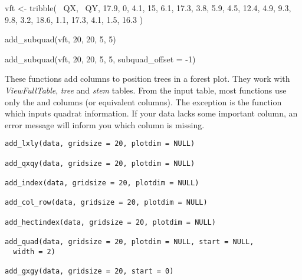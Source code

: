 \documentclass[a4paper]{book}
\begin{document}
%
\begin{Examples}
\begin{ExampleCode}
vft <- tribble(
   ~QX,  ~QY,
  17.9,    0,
   4.1,   15,
   6.1, 17.3,
   3.8,  5.9,
   4.5, 12.4,
   4.9,  9.3,
   9.8,  3.2,
  18.6,  1.1,
  17.3,  4.1,
   1.5, 16.3
)

add_subquad(vft, 20, 20, 5, 5)

add_subquad(vft, 20, 20, 5, 5, subquad_offset = -1)

\end{ExampleCode}
\end{Examples}
%
\begin{Description}\relax
These functions add columns to position trees in a forest plot. They work
with \emph{ViewFullTable}, \emph{tree} and \emph{stem} tables. From the input table, most
functions use only the  and  columns (or equivalent columns). The
exception is the function  which inputs quadrat information. If
your data lacks some important column, an error message will inform you which
column is missing.
\end{Description}
%
\begin{Usage}
\begin{verbatim}
add_lxly(data, gridsize = 20, plotdim = NULL)

add_qxqy(data, gridsize = 20, plotdim = NULL)

add_index(data, gridsize = 20, plotdim = NULL)

add_col_row(data, gridsize = 20, plotdim = NULL)

add_hectindex(data, gridsize = 20, plotdim = NULL)

add_quad(data, gridsize = 20, plotdim = NULL, start = NULL,
  width = 2)

add_gxgy(data, gridsize = 20, start = 0)
\end{verbatim}
\end{Usage}
%
\end{document}
